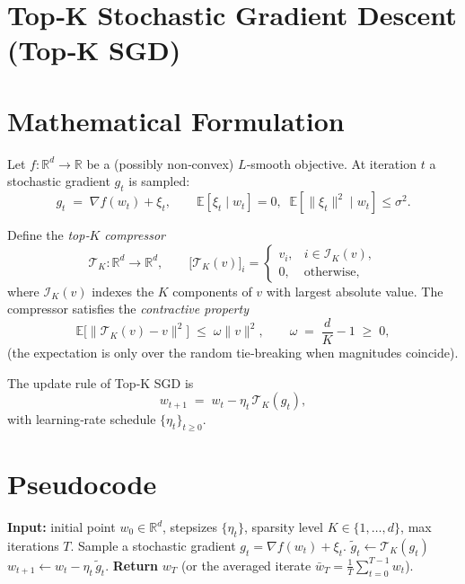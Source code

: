 \documentclass{article}
\newcommand{\TopK}{\mathcal{T}_K}
\newcommand{\E}{\mathbb{E}}
\newcommand{\R}{\mathbb{R}}
\begin{document}
\section*{Top‑K Stochastic Gradient Descent (Top‑K SGD)}

\section*{Mathematical Formulation}
Let $f:\R^{d}\rightarrow\R$ be a (possibly non‑convex) $L$‑smooth objective.  
At iteration $t$ a stochastic gradient $g_t$ is sampled:
\[
g_t \;=\; \nabla f(w_t) + \xi_t,
\qquad 
\E[\xi_t\mid w_t]=0,\;\;
\E[\|\xi_t\|^{2}\mid w_t]\le\sigma^{2}.
\]

Define the \emph{top‑$K$ compressor}
\[
\TopK:\R^{d}\rightarrow\R^{d},\qquad
\big[\TopK(v)\big]_i=\begin{cases}
v_i, & i\in\mathcal{I}_K(v),\\[2pt]
0,   & \text{otherwise},
\end{cases}
\]
where $\mathcal{I}_K(v)$ indexes the $K$ components of $v$ with largest absolute value.
The compressor satisfies the \emph{contractive property}
\begin{equation}
\label{eq:contract}
\E\!\big[\|\TopK(v)-v\|^{2}\big]\;\le\;\omega\|v\|^{2},
\qquad\omega\;=\;\frac{d}{K}-1\;\ge\;0,
\end{equation}
(the expectation is only over the random tie‑breaking when magnitudes coincide).

The update rule of Top‑K SGD is
\begin{equation}
\label{eq:update}
w_{t+1}\;=\;w_t-\eta_t\,\TopK(g_t),
\end{equation}
with learning‑rate schedule $\{\eta_t\}_{t\ge0}$.

\section*{Pseudocode}
\begin{algorithm}[H]
\caption{Top‑K SGD}
\begin{algorithmic}[1]
\State \textbf{Input:} initial point $w_0\in\R^{d}$, stepsizes $\{\eta_t\}$, sparsity level $K\in\{1,\dots ,d\}$, max iterations $T$.
    \State Sample a stochastic gradient $g_t=\nabla f(w_t)+\xi_t$.
    \State $\displaystyle \tilde g_t\gets\TopK(g_t)$ \hfill{}
    \State $w_{t+1}\gets w_t-\eta_t\,\tilde g_t$.
\EndFor
\State \textbf{Return} $w_T$ (or the averaged iterate $\bar w_T=\frac1T\sum_{t=0}^{T-1}w_t$).
\end{algorithmic}
\end{algorithm}
\end{document}
